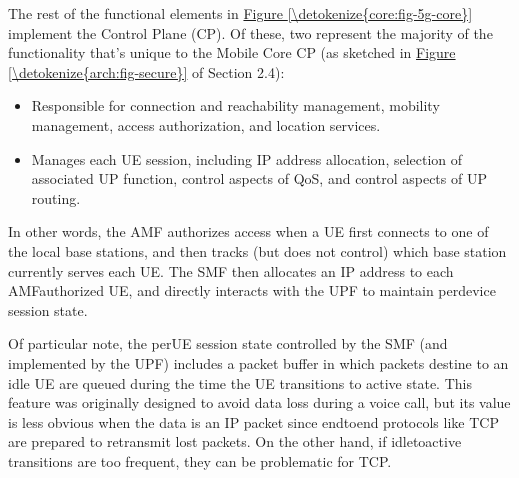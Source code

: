 \documentclass[a4paper,11pt,english]{sphinxmanual}
\begin{document}
\sphinxAtStartPar
The rest of the functional elements in \hyperref[\detokenize{core:fig-5g-core}]{Figure \ref{\detokenize{core:fig-5g-core}}} implement the Control Plane (CP). Of these, two
represent the majority of the functionality that’s unique to the
Mobile Core CP (as sketched in \hyperref[\detokenize{arch:fig-secure}]{Figure \ref{\detokenize{arch:fig-secure}}} of
Section 2.4):
\begin{itemize}
\item {} 
\sphinxAtStartPar
{} Responsible for
connection and reachability management, mobility management, access
authorization, and location services.

\item {} 
\sphinxAtStartPar
{} Manages each UE session,
including IP address allocation, selection of associated UP
function, control aspects of QoS, and control aspects of UP
routing.

\end{itemize}

\sphinxAtStartPar
In other words, the AMF authorizes access when a UE first connects to
one of the local base stations, and then tracks (but does not control)
which base station currently serves each UE. The SMF then allocates an
IP address to each AMF\sphinxhyphen{}authorized UE, and directly interacts with the
UPF to maintain per\sphinxhyphen{}device session state.

\sphinxAtStartPar
Of particular note, the per\sphinxhyphen{}UE session state controlled by the SMF
(and implemented by the UPF) includes a packet buffer in which packets
destine to an idle UE are queued during the time the UE transitions to
active state. This feature was originally designed to avoid data loss
during a voice call, but its value is less obvious when the data is an
IP packet since end\sphinxhyphen{}to\sphinxhyphen{}end protocols like TCP are prepared to retransmit
lost packets. On the other hand, if idle\sphinxhyphen{}to\sphinxhyphen{}active transitions are too
frequent, they can be problematic for TCP.
\end{document}

